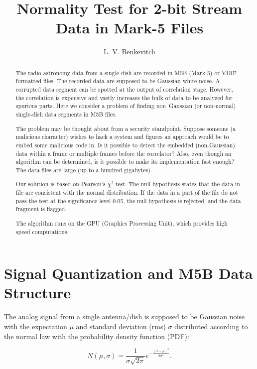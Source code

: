 \documentclass[letterpaper,twoside,12pt]{article}
\title{Normality Test for 2-bit Stream Data in Mark-5 Files}
\author[1]{L. V. Benkevitch}
\affil[1]{\small MIT Haystack observatory, Westford, MA 01886, USA.}
\begin{document}
\maketitle

\begin{abstract}
The radio astronomy data from a single dish are recorded in M5B (Mark-5) or VDIF formatted files. The recorded data are supposed to be Gaussian white noise. A corrupted data segment can be spotted at the output of correlation stage. However, the correlation is expensive and vastly increases the bulk of data to be analyzed for spurious parts. Here we consider a problem of finding non~Gaussian (or non-normal) single-dish data segments in M5B files.

The problem may be thought about from a security standpoint. Suppose someone (a malicious character) wishes to hack a system and figures an approach would be to embed some malicious code in. Is it possible to detect the embedded (non-Gaussian) data within a frame or multiple frames before the correlator? Also, even though an algorithm can be determined, is it possible to make its implementation fast enough? The data files are large (up to a hundred gigabytes).

Our solution is based on Pearson's $\chi^2$ test. The null hypothesis states that the data in file  are consistent with the normal distribution. If the data in a part of the file do not pass the test at the significance level 0.05, the null hypothesis is rejected, and the data fragment is flagged.

The algorithm runs on the GPU (Graphics Processing Unit), which provides high speed computations.
\end{abstract}


\tableofcontents

\section{Signal Quantization and M5B Data Structure}

The analog signal from a single antenna/dish is supposed to be Gaussian noise with the expectation $\mu$ and standard deviation (rms) $\sigma$ distributed according to the normal law with the probability density function (PDF):

\begin{equation}
  \label{normal_pdf}
  N(\mu,\sigma) =  \frac{1}{\sigma\sqrt{2\pi}} e^{-\frac{(x-\mu)^2}{2\sigma^2}}.
\end{equation}
\end{document}
